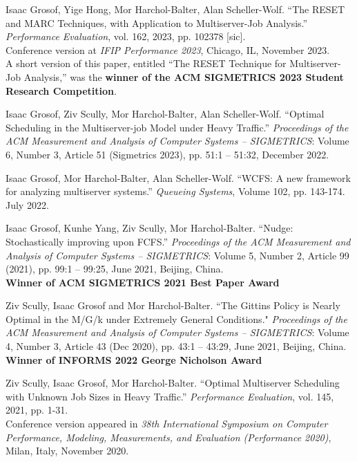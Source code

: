 \documentclass{res}
\begin{document}
\begin{resume}
    Isaac Grosof, Yige Hong, Mor Harchol-Balter, Alan Scheller-Wolf.
    ``The RESET and MARC Techniques, with Application to Multiserver-Job Analysis.''
    \textit{Performance Evaluation}, vol. 162, 2023, pp. 102378 [sic].\\
    Conference version at \textit{IFIP Performance 2023}, Chicago, IL, November 2023. \\
    A short version of this paper, entitled ``The RESET Technique for Multiserver-Job Analysis,''
    was the \textbf{winner of the ACM SIGMETRICS 2023 Student Research Competition}.

    Isaac Grosof, Ziv Scully, Mor Harchol-Balter, Alan Scheller-Wolf.
    ``Optimal Scheduling in the Multiserver-job Model under Heavy Traffic.''
     \textit{Proceedings of the ACM Measurement and Analysis of Computer Systems -- SIGMETRICS}:
     Volume 6, Number 3, Article 51 (Sigmetrics 2023),
     pp. 51:1 -- 51:32, December 2022.

    Isaac Grosof, Mor Harchol-Balter, Alan Scheller-Wolf.
    ``WCFS: A new framework for analyzing multiserver systems.''
    \textit{Queueing Systems}, Volume 102, pp. 143-174. July 2022.

    Isaac Grosof, Kunhe Yang, Ziv Scully, Mor Harchol-Balter.
    ``Nudge: Stochastically improving upon FCFS.''
    \textit{Proceedings of the ACM Measurement and Analysis of Computer Systems -- SIGMETRICS}: Volume 5, Number 2, Article 99 (2021), pp. 99:1 -- 99:25, June 2021, Beijing, China.\\
    \textbf{Winner of ACM SIGMETRICS 2021 Best Paper Award}

    Ziv Scully, Isaac Grosof and Mor Harchol-Balter.
    ``The Gittins Policy is Nearly Optimal in the M/G/k under Extremely General Conditions."
    \textit{Proceedings of the ACM Measurement and Analysis of Computer Systems -- SIGMETRICS}: Volume 4, Number 3, Article 43 (Dec 2020), pp. 43:1 -- 43:29, June 2021, Beijing, China. \\
    \textbf{Winner of INFORMS 2022 George Nicholson Award}

    Ziv Scully, Isaac Grosof, Mor Harchol-Balter.
    ``Optimal Multiserver Scheduling with Unknown Job Sizes in Heavy Traffic.''
    \textit{Performance Evaluation}, vol. 145, 2021, pp. 1-31. \\
    Conference version appeared in
    \textit{38th International Symposium on Computer Performance, Modeling, Measurements, and Evaluation (Performance 2020)},
    Milan, Italy, November 2020.


\end{resume}
\end{document}
